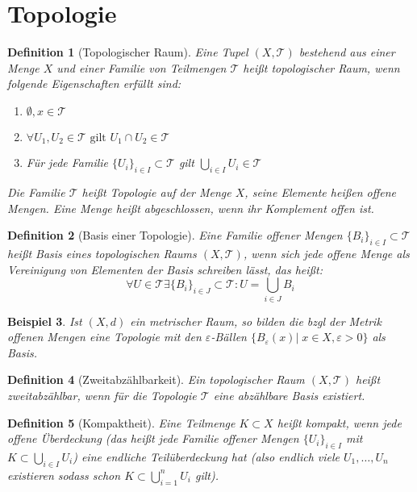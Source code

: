 \documentclass[a4paper]{scrreprt}
\numberwithin{equation}{chapter}
\theoremstyle{plain}
\newtheorem{defn}{Definition}[section]
\newtheorem{bsp}[defn]{Beispiel}
\begin{document}
	\section{Topologie}
		\begin{defn}[Topologischer Raum]
			Eine Tupel $(X,\mathcal{T})$ bestehend aus einer Menge $X$ und einer Familie von Teilmengen $\mathcal{T}$ heißt topologischer Raum, wenn folgende Eigenschaften erfüllt sind:
			\begin{enumerate}[label=$T$\arabic*]
				\item $\emptyset, x\in \mathcal{T}$
				\item $\forall U_1, U_2\in \mathcal{T} \text{ gilt }U_1\cap U_2\in\mathcal{T}$
				\item Für jede Familie $\lbrace U_i\rbrace_{i\in I}\subset \mathcal{T}$ gilt $\bigcup_{i\in I}U_i\in\mathcal{T}$
			\end{enumerate}
			Die Familie $\mathcal{T}$ heißt Topologie auf der Menge $X$, seine Elemente heißen offene Mengen. Eine Menge heißt abgeschlossen, wenn ihr Komplement offen ist.
		\end{defn}
		\begin{defn}[Basis einer Topologie]
			Eine Familie offener Mengen $\lbrace B_i\rbrace_{i\in I}\subset \mathcal{T}$ heißt Basis eines topologischen Raums $(X,\mathcal{T})$, wenn sich jede offene Menge als Vereinigung von Elementen der Basis schreiben lässt, das heißt:
			\begin{equation*}
				\forall U\in\mathcal{T}\exists \lbrace B_i\rbrace_{i\in J}\subset \mathcal{T}: U=\bigcup_{i\in J}B_i
			\end{equation*}
		\end{defn}
		\begin{bsp}
			Ist $(X,d)$ ein metrischer Raum, so bilden die bzgl der Metrik offenen Mengen eine Topologie mit den $\varepsilon$-Bällen $\lbrace B_{\varepsilon}(x)\vert \; x\in X, \varepsilon >0\rbrace$ als Basis.
		\end{bsp}
		\begin{defn}[Zweitabzählbarkeit]
			Ein topologischer Raum $(X,\mathcal{T})$ heißt zweitabzählbar, wenn für die Topologie $\mathcal{T}$ eine abzählbare Basis existiert. 
		\end{defn}
		\begin{defn}[Kompaktheit]
			Eine Teilmenge $K\subset X$ heißt kompakt, wenn jede offene Überdeckung (das heißt jede Familie offener Mengen $\lbrace U_i\rbrace_{i\in I}$ mit $K\subset \bigcup_{i\in I}U_i$) eine endliche Teilüberdeckung hat (also endlich viele $U_1,\ldots,U_n$ existieren sodass schon $K\subset \bigcup_{i=1}^n U_i$ gilt).
		\end{defn}
\end{document}
